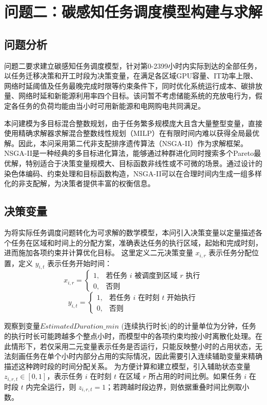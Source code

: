 \documentclass[UTF8,a4paper,zihao=-4]{ctexart}
\begin{document}
\section{问题二：碳感知任务调度模型构建与求解}
\FloatBarrier

\subsection{问题分析}
问题二要求建立碳感知任务调度模型，针对第0-2399小时内实际到达的全部任务，以任务迁移决策和开工时段为决策变量，在满足各区域GPU容量、IT功率上限、网络时延阈值及任务最晚完成时限等约束条件下，同时优化系统运行成本、碳排放量、网络时延和新能源利用率四个目标。该问暂不考虑储能系统的充放电行为，假定各任务的负荷均能由当小时可用新能源和电网购电共同满足。

本问建模为多目标混合整数规划，由于任务繁多规模庞大且含大量整型变量，直接使用精确求解器求解混合整数线性规划（MILP）在有限时间内难以获得全局最优解。因此，本问采用第二代非支配排序遗传算法（NSGA-II）作为求解框架。NSGA-II是一种经典的多目标进化算法，能够通过种群进化同时搜索多个Pareto最优解，特别适合于决策变量规模大、目标函数非线性或不可微的场景。通过设计的染色体编码、约束处理和目标函数构造，NSGA-II可以在合理时间内生成一组多样化的非支配解，为决策者提供丰富的权衡信息。

\subsection{决策变量}
为将实际任务调度问题转化为可求解的数学模型，本问引入决策变量以定量描述各个任务在区域和时间上的分配方案，准确表达任务的执行区域，起始和完成时刻，进而施加各项约束并计算优化目标。
这里定义二元决策变量 $x_{i, r}$ 表示任务分配位置，定义 $y_{i, t}$ 表示任务开始时间：
$$
x_{i, r} = 
\begin{cases} 
1, & \text{若任务 } i \text{ 被调度到区域 } r \text{ 执行} \\ 
0, & \text{否则} 
\end{cases}
$$
$$
y_{i, t} = 
\begin{cases} 
1, & \text{若任务 } i \text{ 在时刻 } t \text{ 开始执行} \\ 
0, & \text{否则} 
\end{cases}
$$

观察到变量$EstimatedDuration\_min$ (连续执行时长)的的计量单位为分钟，任务的执行时长可能跨越多个整点小时，而模型中的各项约束均按小时离散化处理。在此情形下，若仅采用二元变量表示任务是否运行，只能反映整小时的占用状态，无法刻画任务在单个小时内部分占用的实际情况，因此需要引入连续辅助变量来精确描述这种跨时段的时间分配关系。
为方便计算和建立模型，引入辅助状态变量 $z_{i, r, t} \in [0, 1]$，表示任务 $i$ 在时刻 $t$ 在区域 $r$ 所占用的时间比例。如果任务 $i$ 在时段 $t$ 内完全运行，则 $z_{i, r, t} = 1$；若跨越时段边界，则依据重叠时间比例取小数。
\end{document}
